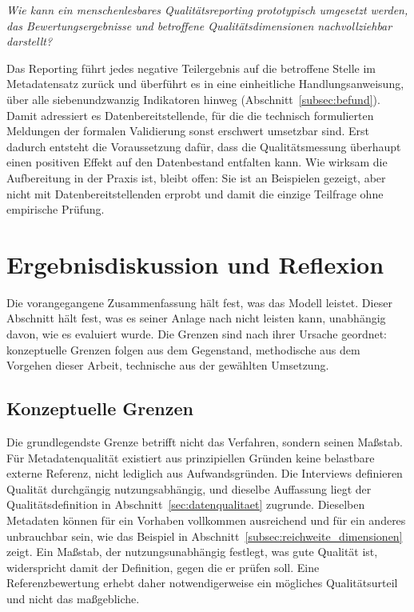 \emph{Wie kann ein menschenlesbares Qualitätsreporting prototypisch umgesetzt
werden, das Bewertungsergebnisse und betroffene Qualitätsdimensionen
nachvollziehbar darstellt?}

Das Reporting führt jedes negative Teilergebnis auf die betroffene Stelle im
Metadatensatz zurück und überführt es in eine einheitliche Handlungsanweisung, über
alle siebenundzwanzig Indikatoren hinweg (Abschnitt~\ref{subsec:befund}). Damit
adressiert es Datenbereitstellende, für die die technisch formulierten Meldungen
der formalen Validierung sonst erschwert umsetzbar sind. Erst dadurch entsteht die
Voraussetzung dafür, dass die Qualitätsmessung überhaupt einen positiven Effekt auf den Datenbestand entfalten kann. Wie wirksam die Aufbereitung in der Praxis ist, bleibt offen: Sie ist an Beispielen gezeigt, aber nicht mit Datenbereitstellenden erprobt und damit die einzige
Teilfrage ohne empirische Prüfung.

\section{Ergebnisdiskussion und Reflexion}
\label{sec:disk_grenzen}

Die vorangegangene Zusammenfassung hält fest, was das Modell leistet. Dieser Abschnitt hält fest, was es seiner Anlage nach nicht leisten kann,
unabhängig davon, wie es evaluiert wurde. Die Grenzen sind nach ihrer Ursache
geordnet: konzeptuelle Grenzen folgen aus dem Gegenstand, methodische aus dem
Vorgehen dieser Arbeit, technische aus der gewählten Umsetzung.

\subsection{Konzeptuelle Grenzen}
Die grundlegendste Grenze betrifft nicht das Verfahren, sondern seinen Maßstab.
Für Metadatenqualität existiert aus prinzipiellen Gründen keine belastbare externe
Referenz, nicht lediglich aus Aufwandsgründen. Die Interviews definieren Qualität
durchgängig nutzungsabhängig, und dieselbe Auffassung liegt der
Qualitätsdefinition in Abschnitt~\ref{sec:datenqualitaet} zugrunde. Dieselben Metadaten können für ein Vorhaben vollkommen ausreichend und für ein
anderes unbrauchbar sein, wie das Beispiel in
Abschnitt~\ref{subsec:reichweite_dimensionen} zeigt. Ein
Maßstab, der nutzungsunabhängig festlegt, was gute Qualität ist, widerspricht
damit der Definition, gegen die er prüfen soll. Eine Referenzbewertung erhebt daher notwendigerweise ein mögliches Qualitätsurteil
und nicht das maßgebliche.

